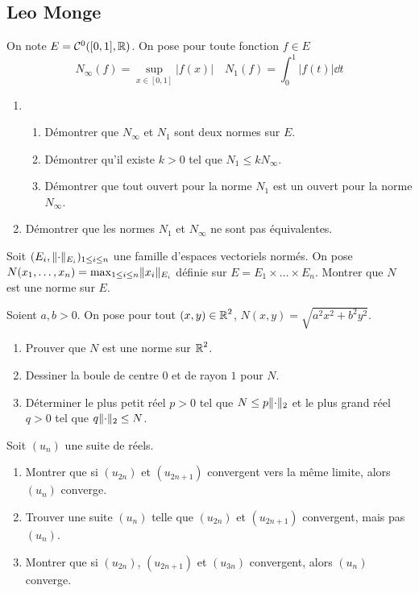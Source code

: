 \documentclass[10pt]{scrartcl}
\begin{document}
    \subsection*{Leo Monge}
    \begin{ccp}
        On note $E=\mathcal C^0([0,1],\operatorname{\mathbb R})$. 
        On pose pour toute fonction $f\in E$ 
        \[
            N_\infty(f)=\sup_{x\in[0,1]}|f(x)|\quad N_1(f)=\int_0^1|f(t)|\dd t
        \]
        \begin{enumerate}
            \item
            \begin{enumerate}
                \item Démontrer que $N_\infty$ et $N_1$ sont deux normes sur $E$. 
                \item Démontrer qu'il existe $k>0$ tel que $N_1\leq kN_\infty$.
                \item Démontrer que tout ouvert pour la norme $N_1$ est un ouvert pour la norme $N_\infty$.
            \end{enumerate}
            \item Démontrer que les normes $N_1$ et $N_\infty$ ne sont pas équivalentes.
        \end{enumerate}
    \end{ccp}

    \begin{exo}
        Soit $(E_i,\lVert \cdot\rVert_{E_i})_{1\leq i\leq n}$ une famille d'espaces vectoriels normés. 
        On pose $N(x_1,\dots,x_n)=\max_{1\leq i\leq n}\lVert x_i\rVert_{E_i}$ définie sur $E=E_1\times\dots\times E_n$. 
        Montrer que $N$ est une norme sur $E$.
    \end{exo}

    \begin{exo}
        Soient $a,b>0$. On pose pour tout $(x,y)\in\operatorname{\mathbb R}^2$, $N(x,y)=\sqrt{a^2x^2+b^2y^2}$. 
        \begin{enumerate}
            \item Prouver que $N$ est une norme sur $\operatorname{\mathbb R}^2$.
            \item Dessiner la boule de centre $0$ et de rayon $1$ pour $N$.
            \item Déterminer le plus petit réel $p>0$ tel que $N\leq p\lVert \cdot\rVert_2$ et le plus grand réel $q>0$ tel que $q\lVert \cdot\rVert_2\leq N$.
        \end{enumerate}
    \end{exo}

    \begin{exo}
        Soit $(u_n)$ une suite de réels.
        \begin{enumerate}
            \item Montrer que si $(u_{2n})$ et $(u_{2n+1})$ convergent vers la même limite, alors $(u_n)$ converge. 
            \item Trouver une suite $(u_n)$ telle que $(u_{2n})$ et $(u_{2n+1})$ convergent, mais pas $(u_n)$.
            \item Montrer que si $(u_{2n})$, $(u_{2n+1})$ et $(u_{3n})$ convergent, alors $(u_n)$ converge.
        \end{enumerate}
    \end{exo}
\end{document}
